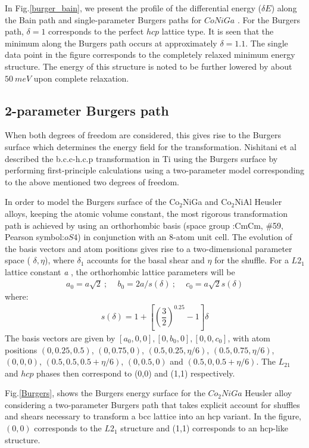 \documentclass[%
preprint,
 amsmath,amssymb,
 aps,
prb,
showkeys,
]{revtex4-1}
\begin{document}
In Fig.\ref{burger_bain}, we present the profile of the differential energy ($\delta E$) along the Bain path and single-parameter Burgers paths for $CoNiGa$ . For the Burgers path, $\delta =1$ corresponds to the perfect $hcp$ lattice type. It is seen that the minimum along the Burgers path occurs at approximately $\delta =1.1$. The single data point in the figure corresponds to the completely relaxed minimum energy structure. The energy of this structure is noted to be further lowered by about $50 \ meV $ upon complete relaxation. 

\subsection{2-parameter Burgers path}
\label{Sec:2D_formalism}
 When both degrees of freedom are considered, this gives rise to the Burgers surface which determines the energy field for the transformation. Nishitani et al \cite{nishitani2001first} described the b.c.c-h.c.p transformation in Ti using the Burgers surface by performing first-principle calculations using a two-parameter model corresponding to the above mentioned two degrees of freedom. 

 In order to model the Burgers surface of the Co$_2$NiGa and Co$_2$NiAl Heusler alloys, keeping the atomic volume constant, the most rigorous transformation path is achieved by using an orthorhombic basis (space group :CmCm, \#59, Pearson symbol:$oS4$) in conjunction with an 8-atom unit cell. The evolution of the basis vectors and atom positions gives rise to a two-dimensional parameter space ( $\delta, \eta$), where $\delta_1$ accounts for the basal shear and $\eta$ for the shuffle. For a $L2_{1}$ lattice constant \textit{a} , the orthorhombic lattice parameters will be
\begin{align}
  a_0 =a\sqrt{2}\ ; \ \ \ \ \; b_0 =2a/s(\delta)\ ; \ \ \ \ \; c_0 = a\sqrt{2}s(\delta)
  \end{align}
where:  
\begin{align}
s(\delta) = 1 + \left[\left( \dfrac{3}{2}\right)^{0.25} - 1\right]\delta
\end{align}
The basis vectors are given by $[a_0,0,0],[0,b_0,0],[0,0,c_0]$, with atom positions $(0, 0.25, 0.5)$, $(0, 0.75, 0)$, $(0.5, 0.25, \eta/6)$, $(0.5, 0.75, \eta/6)$, $(0, 0, 0)$, $(0.5, 0.5, 0.5 + \eta/6)$, $(0, 0.5, 0)$ and  $(0.5, 0, 0.5 + \eta/6)$.
The $L_21$ and $hcp$ phases then correspond to (0,0) and (1,1) respectively.

Fig.\ref{Burgers}, shows the Burgers energy surface for the $Co_2NiGa$  Heusler alloy considering a two-parameter Burgers path that takes explicit account for shuffles and shears necessary to transform a bcc lattice into an hcp variant. In the figure, $(0,0)$ corresponds to the $L2_1$ structure and (1,1) corresponds to an hcp-like structure. 
\end{document}
